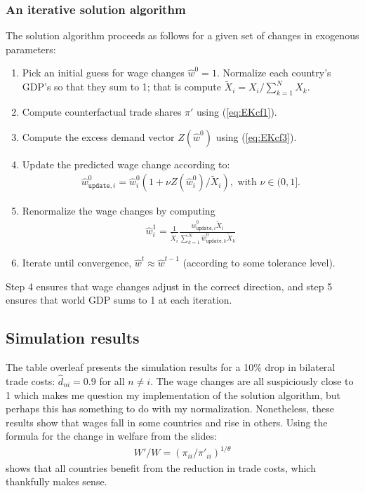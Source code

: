 \documentclass[12pt]{article}
\newcommand{\mtx}[1]{\ensuremath{\bm{\mathit{#1}}}}
\begin{document}
\subsubsection{An iterative solution algorithm}
The solution algorithm proceeds as follows for a given set of changes in exogenous parameters:
\begin{enumerate}
\item Pick an initial guess for wage changes $\hat{\mtx{w}}^0 = 1$. Normalize each country's GDP's so that they sum to 1; that is compute $\tilde X_i = X_i /\sum_{k=1}^N X_k$.
\item Compute counterfactual trade shares $\mtx{\pi}'$ using (\ref{eq:EKcf1}).
\item Compute the excess demand vector $\mtx{Z}(\hat{\mtx{w}}^0)$ using  (\ref{eq:EKcf3}).
\item Update the predicted wage change according to:
\begin{align*}
\hat{w}^0_{\texttt{update},i} = \hat w^0_i(1+ \nu Z(\hat{{w}}_i^0)/\tilde X_i), \text{ with } \nu \in(0,1].
\end{align*}
\item Renormalize the wage changes by computing
\begin{align*}
\hat{{w}}_i^1 = \frac{1}{\tilde X_i}\frac{\hat{w}^0_{\texttt{update},i} \tilde X_i}{\sum_{k=1}^N \hat{w}^0_{\texttt{update},k} \tilde X_k}
\end{align*}
\item Iterate until convergence, $\hat{\mtx{w}}^t \approx \hat{\mtx{w}}^{t-1}$ (according to some tolerance level).
\end{enumerate}
Step 4 ensures that wage changes adjust in the correct direction, and step 5 ensures that world GDP sums to 1 at each iteration.


\subsection{Simulation results}
The table overleaf presents the simulation results for a 10\% drop in bilateral trade costs: $\hat d_{ni} = 0.9$ for all $n\neq i$. The wage changes are all suspiciously close to 1 which makes me question my implementation of the solution algorithm, but perhaps this has something to do with my normalization. Nonetheless, these results show that wages fall in some countries and rise in others. Using the formula for the change in welfare from the slides:
\begin{align*}
W'/W = (\pi_{ii}/\pi'_{ii})^{1/\theta}
\end{align*}
shows that all countries benefit from the reduction in trade costs, which thankfully makes sense.
\end{document}

